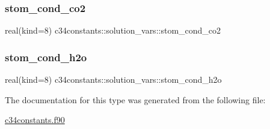 \subsubsection{\texorpdfstring{stom\+\_\+cond\+\_\+co2}{stom\_cond\_co2}}
{\footnotesize\ttfamily real(kind=8) c34constants\+::solution\+\_\+vars\+::stom\+\_\+cond\+\_\+co2}

\mbox{\label{structc34constants_1_1solution__vars_af8670de0f15d89016b814037183ece8e}} 
\subsubsection{\texorpdfstring{stom\+\_\+cond\+\_\+h2o}{stom\_cond\_h2o}}
{\footnotesize\ttfamily real(kind=8) c34constants\+::solution\+\_\+vars\+::stom\+\_\+cond\+\_\+h2o}



The documentation for this type was generated from the following file\+:\begin{DoxyCompactItemize}
\item 
\hyperlink{c34constants_8f90}{c34constants.\+f90}\end{DoxyCompactItemize}

